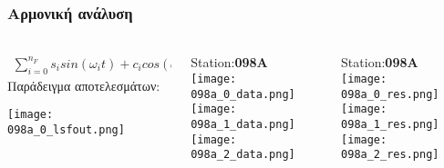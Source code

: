 \begin{frame}
  \frametitle{Αρμονική ανάλυση}
  \framesubtitle{}
  \label{}
  \vskip-1cm
  \begin{columns}[T]
    \begin{column}{.33\textwidth}
      \begin{align*}
        \sum_{i=0}^{n_F} s_{i} sin(\omega_{i}t) + c_{i} cos(\omega_{i}t)
      \end{align*}
      Παράδειγμα αποτελεσμάτων:
       \begin{center}
         \texttt{[image: 098a\_0\_lsfout.png]}
       \end{center}
    \end{column}
    \begin{column}{.33\textwidth}
      \begin{center}
      Station:\textbf{098A}\\
         \texttt{[image: 098a\_0\_data.png]}\\
         \texttt{[image: 098a\_1\_data.png]}\\
         \texttt{[image: 098a\_2\_data.png]}
       \end{center} 
    \end{column}
    \begin{column}{.33\textwidth}
      \begin{center}
      Station:\textbf{098A}\\
         \texttt{[image: 098a\_0\_res.png]}\\
         \texttt{[image: 098a\_1\_res.png]}\\
         \texttt{[image: 098a\_2\_res.png]}
       \end{center} 
    \end{column}
  \end{columns}
\end{frame}
\note{}

